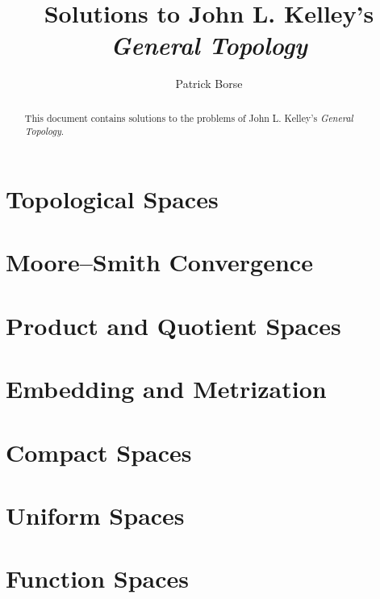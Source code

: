 \documentclass[oneside]{amsbook}
\title{Solutions to John L. Kelley's\\ \emph{General Topology}}
\author{Patrick Borse}
\numberwithin{prob}{chapter}
\begin{document}
\begin{abstract}
This document contains solutions to the problems of John L. Kelley's \emph{General Topology}. 
\end{abstract}

\maketitle

\tableofcontents

\chapter{Topological Spaces}


\chapter{Moore--Smith Convergence}


\chapter{Product and Quotient Spaces}


\chapter{Embedding and Metrization}


\chapter{Compact Spaces}


\chapter{Uniform Spaces}


\chapter{Function Spaces}

\end{document}
